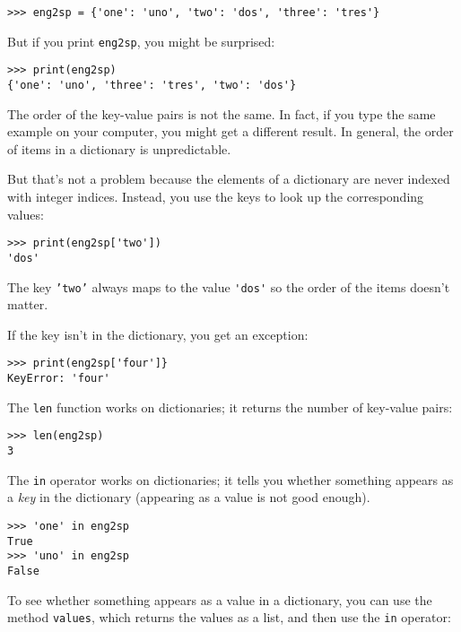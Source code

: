 \beforeverb
\begin{verbatim}
>>> eng2sp = {'one': 'uno', 'two': 'dos', 'three': 'tres'}
\end{verbatim}
\afterverb
%
But if you print {\tt eng2sp}, you might be surprised:

\beforeverb
\begin{verbatim}
>>> print(eng2sp)
{'one': 'uno', 'three': 'tres', 'two': 'dos'}
\end{verbatim}
\afterverb
%
The order of the key-value pairs is not the same.  In fact, if
you type the same example on your computer, you might get a
different result.  In general, the order of items in
a dictionary is unpredictable.

But that's not a problem because
the elements of a dictionary are never indexed with integer indices.
Instead, you use the keys to look up the corresponding values:

\beforeverb
\begin{verbatim}
>>> print(eng2sp['two'])
'dos'
\end{verbatim}
\afterverb
%
The key {\tt 'two'} always maps to the value \verb"'dos'" so the order
of the items doesn't matter.

If the key isn't in the dictionary, you get an exception:


\beforeverb
\begin{verbatim}
>>> print(eng2sp['four']}
KeyError: 'four'
\end{verbatim}
\afterverb
%
The {\tt len} function works on dictionaries; it returns the
number of key-value pairs:


\beforeverb
\begin{verbatim}
>>> len(eng2sp)
3
\end{verbatim}
\afterverb
%
The {\tt in} operator works on dictionaries; it tells you whether
something appears as a \emph{key} in the dictionary (appearing
as a value is not good enough).


\beforeverb
\begin{verbatim}
>>> 'one' in eng2sp
True
>>> 'uno' in eng2sp
False
\end{verbatim}
\afterverb
%
To see whether something appears as a value in a dictionary, you
can use the method {\tt values}, which returns the values as
a list, and then use the {\tt in} operator:

